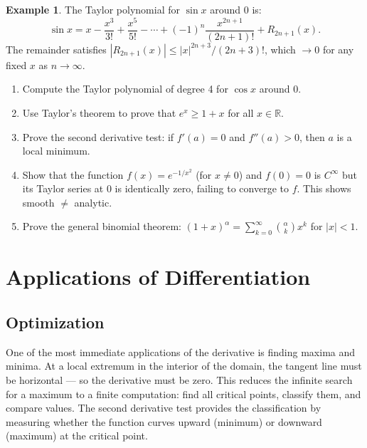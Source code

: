 \documentclass[12pt, openany]{book}
\theoremstyle{plain}
\theoremstyle{definition}
\newtheorem{example}[theorem]{Example}
\theoremstyle{remark}
\newcommand{\R}{\mathbb{R}}
\begin{document}
\begin{example}
The Taylor polynomial for $\sin x$ around $0$ is:
\[ \sin x = x - \frac{x^3}{3!} + \frac{x^5}{5!} - \cdots + (-1)^n \frac{x^{2n+1}}{(2n+1)!} + R_{2n+1}(x). \]
The remainder satisfies $|R_{2n+1}(x)| \leq |x|^{2n+3}/(2n+3)!$, which $\to 0$ for any fixed $x$ as $n \to \infty$.
\end{example}

\begin{exbox}
\begin{enumerate}
  \item Compute the Taylor polynomial of degree 4 for $\cos x$ around $0$.
  \item Use Taylor's theorem to prove that $e^x \geq 1 + x$ for all $x \in \R$.
  \item Prove the second derivative test: if $f'(a) = 0$ and $f''(a) > 0$, then $a$ is a local minimum.
  \item Show that the function $f(x) = e^{-1/x^2}$ (for $x \neq 0$) and $f(0) = 0$ is $C^\infty$ but its Taylor series at $0$ is identically zero, failing to converge to $f$. This shows smooth $\neq$ analytic.
  \item Prove the general binomial theorem: $(1+x)^\alpha = \sum_{k=0}^\infty \binom{\alpha}{k} x^k$ for $|x| < 1$.
\end{enumerate}
\end{exbox}
\color{black}

\chapter{Applications of Differentiation}
\color{black}

\section{Optimization}

One of the most immediate applications of the derivative is finding maxima and minima.  At a local extremum in the interior of the domain, the tangent line must be horizontal --- so the derivative must be zero.  This reduces the infinite search for a maximum to a finite computation: find all critical points, classify them, and compare values.  The second derivative test provides the classification by measuring whether the function curves upward (minimum) or downward (maximum) at the critical point.
\end{document}
